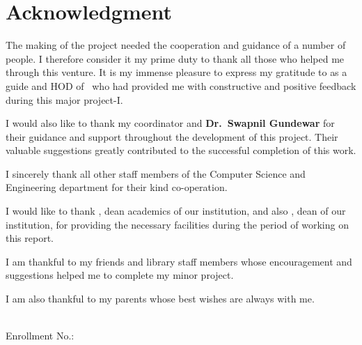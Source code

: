 \chapter*{Acknowledgment}
\justifying
The making of the project needed the cooperation and guidance of a number of people. I therefore consider it my prime duty to thank all those who helped me through this venture. It is my immense pleasure to express my gratitude to \textbf{\SupervisorName} as a guide and HOD of \DeptName\ who had provided me with constructive and positive feedback during this major project-I.

I would also like to thank my coordinator \textbf{\CoordinatorName} and \textbf{Dr.\ Swapnil Gundewar} for their guidance and support throughout the development of this project. Their valuable suggestions greatly contributed to the successful completion of this work.

I sincerely thank all other staff members of the Computer Science and Engineering department for their kind co-operation.

I would like to thank \textbf{\DeanAcademics}, dean academics of our institution, and also \textbf{\DeanFEAT}, dean of our institution, for providing the necessary facilities during the period of working on this report.

I am thankful to my friends and library staff members whose encouragement and suggestions helped me to complete my minor project.

I am also thankful to my parents whose best wishes are always with me.

\vspace{28pt}
\begin{flushright}
\textbf{\StudentName}\\
Enrollment No.: \Enrollment
\end{flushright}
\clearpage
